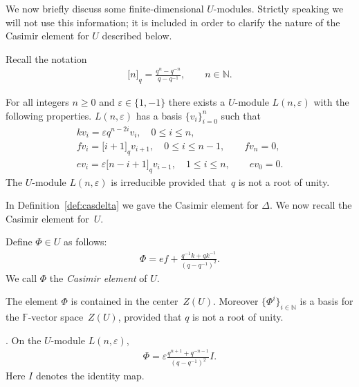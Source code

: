 We now brief\/ly discuss some
f\/inite-dimensional $U$-modules. Strictly speaking
we will not use this information; it is included
in order to clarify the nature of the Casimir element
for $U$ described below.

Recall the notation
\begin{gather*}
  \lbrack  n \rbrack_q=\frac{q^n-q^{-n}}{q-q^{-1}},
  \qquad n \in \mathbb N.
\end{gather*}

\begin{Lemma}
For all integers $n\geq 0$ and $\varepsilon \in \lbrace 1,-1\rbrace$
there exists a
$U$-module
$L(n,\varepsilon)$ with the following properties.
$L(n,\varepsilon)$ has a basis
$\lbrace v_i\rbrace_{i=0}^n$
such that
\begin{gather*}
k v_i  =  \varepsilon q^{n-2i} v_i, \quad  0 \leq i \leq n,
\\
f v_i = \lbrack i+1 \rbrack_q v_{i+1}, \quad 0 \leq i \leq n-1,
\qquad fv_n =0,
\\
e v_i = \varepsilon
\lbrack n-i+1 \rbrack_q v_{i-1}, \quad 1 \leq i \leq n,
\qquad ev_0 =0.
\end{gather*}
The
$U$-module
$L(n,\varepsilon)$ is irreducible provided that~$q$ is not a root of unity.
\end{Lemma}


In Def\/inition~\ref{def:casdelta} we gave the Casimir element
for $\Delta$. We now recall the Casimir element
for~$U$.

\begin{Definition}
\label{def:casu}
Def\/ine
 $\Phi \in
U$ as follows:
\begin{gather*}
\Phi = ef +\frac{q^{-1}k + qk^{-1}}{(q-q^{-1})^2}.
\end{gather*}
We call $\Phi$ the {\it Casimir element} of
$U$.
\end{Definition}

\begin{Lemma}
The element
$\Phi$ is contained in the center~$Z(U)$.
Moreover $\lbrace \Phi^i\rbrace_{i \in \mathbb N}$ is a basis
for the $\mathbb F$-vector space~$Z(U)$,
 provided that $q$ is not a root of unity.
\end{Lemma}





\begin{Lemma}
\label{lem:normmeaning}
{\rm \cite[Lemma~2.7]{jantzen}.}
On the
$U$-module
$L(n,\varepsilon)$,
\begin{gather*}
\Phi  =  \varepsilon \frac{q^{n+1}+q^{-n-1}}{(q-q^{-1})^2} I.
\end{gather*}
Here $I$ denotes the identity map.
\end{Lemma}

